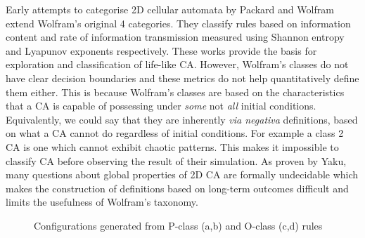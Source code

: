Early attempts to categorise 2D cellular automata by Packard and Wolfram\cite{packard1985two} extend Wolfram's original 4 categories. They classify rules based on information content and rate of information transmission measured using Shannon entropy and Lyapunov exponents respectively. These works provide the basis for exploration and classification of life-like CA. However, Wolfram's classes do not have clear decision boundaries and these metrics do not help quantitatively define them either. This is because Wolfram's classes are based on the characteristics that a CA is capable of possessing under \textit{some} not \textit{all} initial conditions. Equivalently, we could say that they are inherently \textit{via negativa} definitions, based on what a CA cannot do regardless of initial conditions.  For example a class 2 CA is one which cannot exhibit chaotic patterns. This makes it impossible to classify CA before observing the result of their simulation. As proven by Yaku\cite{yaku1973constructibility}, many questions about global properties of 2D CA are formally undecidable which makes the construction of definitions based on long-term outcomes difficult and limits the usefulness of Wolfram's taxonomy.

\begin{figure}[!h]
\centering
            \hfill
            \hfill
            \hfill
            \caption{Configurations generated from P-class (a,b) and O-class (c,d) rules \cite{adamatzky2006phenomenology}}
\label{fig:po-class}
\end{figure}

